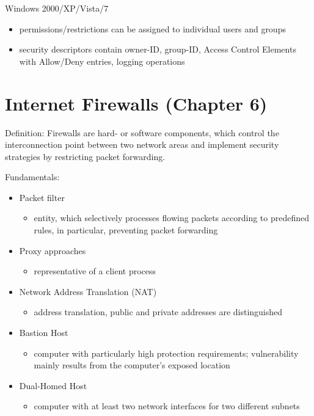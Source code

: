 \documentclass[11pt]{article}
\begin{document}
Windows 2000/XP/Vista/7
\begin{itemize}
\item permissions/restrictions can be assigned to individual users and groups
\item security descriptors contain owner-ID, group-ID, Access Control Elements with Allow/Deny entries, logging operations
\end{itemize}

\section{Internet Firewalls (Chapter 6)}
\label{sec:org628b9b4}
Definition: Firewalls are hard- or software components, which control the interconnection point between two network areas and implement security strategies by restricting packet forwarding.

Fundamentals:
\begin{itemize}
\item Packet filter
\begin{itemize}
\item entity, which selectively processes flowing packets according to predefined rules, in particular, preventing packet forwarding
\end{itemize}
\item Proxy approaches
\begin{itemize}
\item representative of a client process
\end{itemize}
\item Network Address Translation (NAT)
\begin{itemize}
\item address translation, public and private addresses are distinguished
\end{itemize}
\item Bastion Host
\begin{itemize}
\item computer with particularly high protection requirements; vulnerability mainly results from the computer's exposed location
\end{itemize}
\item Dual-Homed Host
\begin{itemize}
\item computer with at least two network interfaces for two different subnets
\end{itemize}
\end{itemize}
\end{document}
